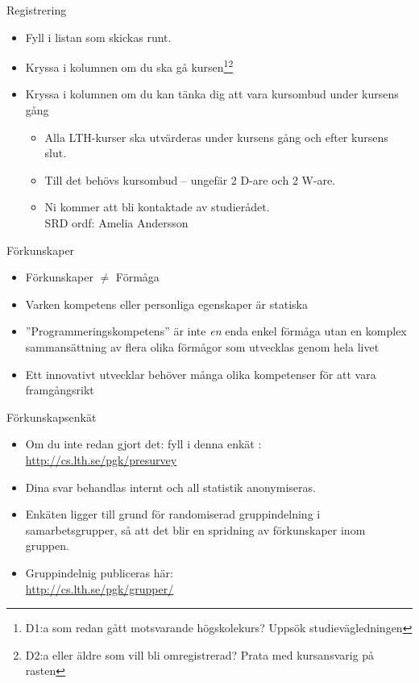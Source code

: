 \begin{Slide}{Registrering}
\begin{itemize}
\item Fyll i listan som skickas runt.
\item Kryssa i kolumnen  om du ska gå kursen\footnote{\scriptsize D1:a som redan gått motsvarande högskolekurs? Uppsök studievägledningen}\footnote{\scriptsize D2:a eller äldre som vill bli omregistrerad? Prata med kursansvarig på rasten}
\item Kryssa i kolumnen  om du kan tänka dig att vara kursombud under kursens gång
\begin{itemize}
\item Alla LTH-kurser ska utvärderas under kursens gång och efter kursens slut.
\item Till det behövs kursombud -- ungefär 2 D-are och 2 W-are.
\item Ni kommer att bli kontaktade av studierådet. \\SRD ordf: Amelia Andersson
\end{itemize}
\end{itemize}
\end{Slide}

\begin{Slide}{Förkunskaper}
\begin{itemize}
\item Förkunskaper $\neq$ Förmåga
\item Varken kompetens eller personliga egenskaper är statiska 
\item ''Programmeringskompetens'' är inte \textit{en} enda enkel förmåga utan en komplex sammansättning av flera olika förmågor som utvecklas genom hela livet
\item Ett innovativt utvecklar behöver många olika kompetenser för att vara framgångsrikt
\end{itemize}
\end{Slide}

\begin{Slide}{Förkunskapsenkät}
\begin{itemize}
\item Om du inte redan gjort det: fyll i denna enkät :\\
\url{http://cs.lth.se/pgk/presurvey} \\
\item Dina svar behandlas internt och all statistik anonymiseras.
\item Enkäten ligger till grund för randomiserad gruppindelning i samarbetsgrupper, så att det blir en spridning av förkunskaper inom gruppen.
\item Gruppindelnig publiceras här: \\ \url{http://cs.lth.se/pgk/grupper/}
\end{itemize}
\end{Slide}

